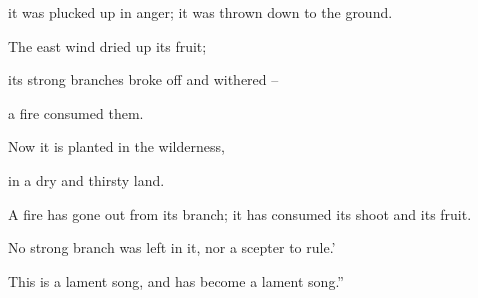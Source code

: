 {it was plucked
up in anger;
it was thrown
down to the ground.
\par }{\Q The east
wind
dried
up its fruit;
\par }{\Q its strong
branches broke off
and withered
–
\par }{\Q a fire
consumed them.
\par }{\Q {}Now
it is planted
in the wilderness,
\par }{\Q in a dry
and thirsty
land.
\par }{\Q {}A fire
has gone out
from its branch;
it has consumed
its shoot and its fruit.
\par }{\Q No
strong
branch
was left in it, nor a scepter
to rule.’
\par }{\PP This is a lament
song, and has become
a lament song.”

\par }
